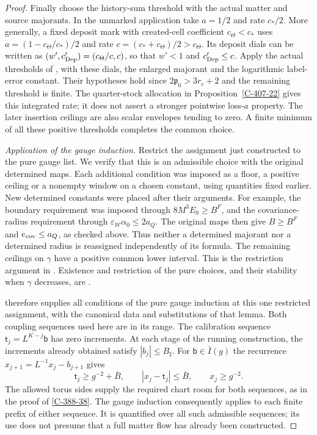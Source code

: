 \documentclass[11pt,letterpaper,reqno]{amsart}
\theoremstyle{definition}
\theoremstyle{remark}
\begin{document}
\begin{proof}
Finally choose the history-sum threshold with the actual
matter and source majorants. In the unmarked application
take $a=1/2$ and rate $c_*/2$. More generally, a fixed
deposit mark with created-cell coefficient $c_\Theta<c_*$
uses $a=(1-c_\Theta/c_*)/2$ and rate
$c=(c_*+c_\Theta)/2>c_\Theta$. Its deposit dials can be
written as $(w',c_{\rm Dep}')=(c_\Theta/c,c)$, so that
$w'<1$ and $c_{\rm Dep}'\le c$. Apply the actual thresholds
of \cite[Proposition~67.6]{YMM1}, with these dials, the enlarged majorant
and the logarithmic label-error constant. Their hypotheses
hold since $2\mathfrak p_0>3r_c+2$ and the remaining
threshold is finite. The quarter-stock allocation in
Proposition~\ref{C-407-22} gives this integrated rate; it
does not assert a stronger pointwise loss-$a$ property.
The later insertion ceilings are also scalar envelopes
tending to zero. A finite minimum of all these positive
thresholds completes the common choice.

\emph{Application of the gauge induction.}
Restrict the assignment just constructed to the pure gauge
list. We verify that this is an admissible choice with the
original determined maps. Each additional condition was
imposed as a floor, a positive ceiling or a nonempty window
on a chosen constant, using quantities fixed earlier.
New determined constants were placed after their arguments.
For example, the boundary requirement was imposed through
$8M^3E_0\ge B^F$, and the covariance-radius requirement
through $\varepsilon_{\mathcal W}\alpha_0\le2a_Q$.
The original maps then give $B\ge B^F$ and
$e_{\rm cov}\le a_Q$, as checked above. Thus neither a
determined majorant nor a determined radius is reassigned
independently of its formula. The remaining ceilings on
$\gamma$ have a positive common lower interval.
This is the restriction argument in
\cite[proof of Theorem C-396-26, paragraph ``The choices'']{fermion-notes}.
Existence and restriction of the pure choices, and their
stability when $\gamma$ decreases, are
\cite[Corollary II-202-29]{gauge-notes}.

 therefore supplies all
conditions of the pure gauge induction at this one restricted
assignment, with the canonical data and substitutions of that
lemma. Both coupling sequences used here are in its
range. The calibration sequence
$\mathsf t_j=L^{K-j}\mathsf b$ has zero increments.
At each stage of the running construction, the increments
already obtained satisfy $|b_j|\le B_\sharp$. For
$\mathsf b\in\bar I(g)$ the recurrence
$x_{j+1}=L^{-1}x_j-b_{j+1}$ gives
\[
 \mathsf t_j\ge g^{-2}+\bar B,\qquad
 |x_j-\mathsf t_j|\le\bar B,\qquad x_j\ge g^{-2}.
\]
The allowed torus sides supply the required chart room for
both sequences, as in the proof of \cref{C-388-38}.
The gauge induction consequently applies to each finite
prefix of either sequence. It is quantified over all such
admissible sequences; its use does not presume that a full
matter flow has already been constructed.


\end{proof}
\end{document}
